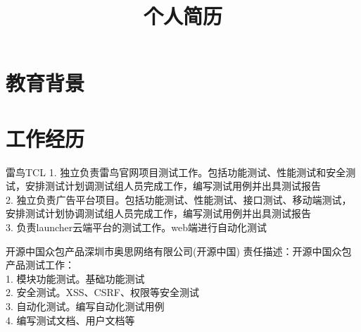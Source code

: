 \documentclass[11pt,a4paper]{moderncv}
\title{个人简历}                      %
\begin{document}
\maketitle

\section{教育背景}



\section{工作经历}
\renewcommand{\baselinestretch}{1.2}

{雷鸟}{TCL}{}{}
{1. 独立负责雷鸟官网项目测试工作。包括功能测试、性能测试和安全测试，安排测试计划调测试组人员完成工作，编写测试用例并出具测试报告\\
2. 独立负责广告平台项目。包括功能测试、性能测试、接口测试、移动端测试，安排测试计划协调测试组人员完成工作，编写测试用例并出具测试报告\\
3. 负责launcher云端平台的测试工作。web端进行自动化测试
}

{开源中国众包产品}{深圳市奥思网络有限公司(开源中国)}{}{}
{责任描述：开源中国众包产品测试工作：\\
1. 模块功能测试。基础功能测试\\
2. 安全测试。XSS、CSRF、权限等安全测试\\
3. 自动化测试。编写自动化测试用例\\
4. 编写测试文档、用户文档等
}
\end{document}
